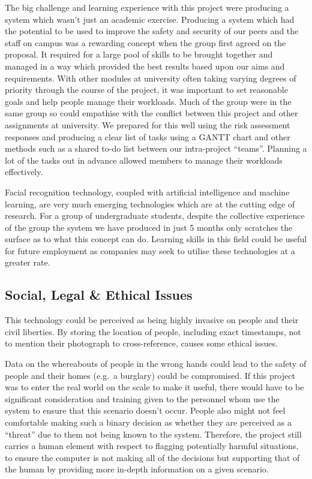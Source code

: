 \documentclass[
  english,
  a4paper,
,tablecaptionabove
]{scrartcl}
\begin{document}
The big challenge and learning experience with this project were
producing a system which wasn't just an academic exercise. Producing a
system which had the potential to be used to improve the safety and
security of our peers and the staff on campus was a rewarding concept
when the group first agreed on the proposal. It required for a large
pool of skills to be brought together and managed in a way which
provided the best results based upon our aims and requirements. With
other modules at university often taking varying degrees of priority
through the course of the project, it was important to set reasonable
goals and help people manage their workloads. Much of the group were in
the same group so could empathise with the conflict between this project
and other assignments at university. We prepared for this well using the
risk assessment responses and producing a clear list of tasks using a
GANTT chart and other methods such as a shared to-do list between our
intra-project \enquote{teams}. Planning a lot of the tasks out in
advance allowed members to manage their workloads effectively.

Facial recognition technology, coupled with artificial intelligence and
machine learning, are very much emerging technologies which are at the
cutting edge of research. For a group of undergraduate students, despite
the collective experience of the group the system we have produced in
just 5 months only scratches the surface as to what this concept can do.
Learning skills in this field could be useful for future employment as
companies may seek to utilise these technologies at a greater rate.

\hypertarget{social-legal-ethical-issues}{%
\subsection{Social, Legal \& Ethical
Issues}\label{social-legal-ethical-issues}}

This technology could be perceived as being highly invasive on people
and their civil liberties. By storing the location of people, including
exact timestamps, not to mention their photograph to cross-reference,
causes some ethical issues.

Data on the whereabouts of people in the wrong hands could lead to the
safety of people and their homes (e.g.~a burglary) could be compromised.
If this project was to enter the real world on the scale to make it
useful, there would have to be significant consideration and training
given to the personnel whom use the system to ensure that this scenario
doesn't occur. People also might not feel comfortable making such a
binary decision as whether they are perceived as a \enquote{threat} due
to them not being known to the system. Therefore, the project still
carries a human element with respect to flagging potentially harmful
situations, to ensure the computer is not making all of the decisions
but supporting that of the human by providing more in-depth information
on a given scenario.
\end{document}
